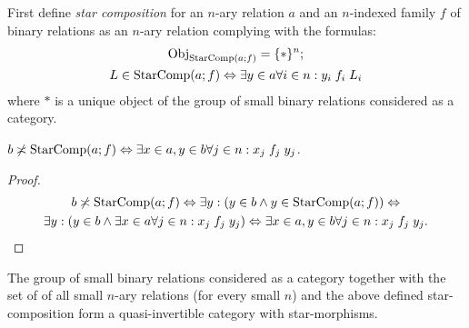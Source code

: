 First define \emph{star composition} for an $n$-ary relation $a$
and an $n$-indexed family $f$ of binary relations as an $n$-ary
relation complying with the formulas:
\begin{gather*}
\operatorname{Obj}_{\operatorname{StarComp}(a;f)}=\{\ast\}^{n};\\
L\in\operatorname{StarComp}(a;f)\Leftrightarrow\exists y\in a\forall i\in n:y_{i}\mathrel{f_{i}}L_{i}
\end{gather*}
where $\ast$ is a unique object of the group of small binary relations
considered as a category.
\begin{prop}
$b\not\asymp\operatorname{StarComp}(a;f)\Leftrightarrow\exists x\in a,y\in b\forall j\in n:x_{j}\mathrel{f_{j}}y_{j}$.\end{prop}
\begin{proof}
~
\begin{multline*}
b\not\asymp\operatorname{StarComp}(a;f)\Leftrightarrow\exists y:(y\in b\land y\in\operatorname{StarComp}(a;f))\Leftrightarrow\\
\exists y:(y\in b\land\exists x\in a\forall j\in n:x_{j}\mathrel{f_{j}}y_{j})\Leftrightarrow\exists x\in a,y\in b\forall j\in n:x_{j}\mathrel{f_{j}}y_{j}.
\end{multline*}
\end{proof}
\begin{thm}
The group of small binary relations considered as a category together
with the set of of all small $n$-ary relations (for every small $n$) and
the above defined star-composition form a quasi-invertible category
with star-morphisms.\end{thm}
